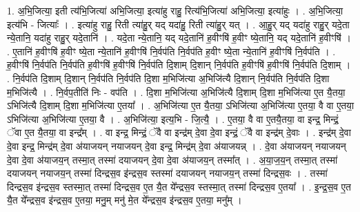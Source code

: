 \documentclass[17pt]{extarticle}
\begin{document}
1. अ॒भि॒जित्या॒ इती त्य॑भि॒जित्या॑ अभि॒जित्या॒ इत्या॑हु राहु॒ रित्य॑भि॒जित्या॑ अभि॒जित्या॒ इत्या॑हुः । . अ॒भि॒जित्या॒ इत्य॑भि - जित्याः᳚ । . इत्या॑हु राहु॒ रिती त्या॑हु॒र् यद् यदा॑हु॒ रिती त्या॑हु॒र् यत् । . आ॒हु॒र् यद् यदा॑हु राहु॒र् यदे॒ता न्ये॒तानि॒ यदा॑हु राहु॒र् यदे॒तानि॑ । . यदे॒ता न्ये॒तानि॒ यद् यदे॒तानि॑ ह॒वीꣳषि॑ ह॒वीꣳ ष्ये॒तानि॒ यद् यदे॒तानि॑ ह॒वीꣳषि॑ । . ए॒तानि॑ ह॒वीꣳषि॑ ह॒वीꣳ ष्ये॒ता न्ये॒तानि॑ ह॒वीꣳषि॑ नि॒र्वप॑ति नि॒र्वप॑ति ह॒वीꣳ ष्ये॒ता न्ये॒तानि॑ ह॒वीꣳषि॑ नि॒र्वप॑ति । . ह॒वीꣳषि॑ नि॒र्वप॑ति नि॒र्वप॑ति ह॒वीꣳषि॑ ह॒वीꣳषि॑ नि॒र्वप॑ति दि॒शाम् दि॒शान् नि॒र्वप॑ति ह॒वीꣳषि॑ ह॒वीꣳषि॑ नि॒र्वप॑ति दि॒शाम् । . नि॒र्वप॑ति दि॒शाम् दि॒शान् नि॒र्वप॑ति नि॒र्वप॑ति दि॒शा म॒भिजि॑त्या अ॒भिजि॑त्यै दि॒शान् नि॒र्वप॑ति नि॒र्वप॑ति दि॒शा म॒भिजि॑त्यै । . नि॒र्वप॒तीति॑ निः - वप॑ति । . दि॒शा म॒भिजि॑त्या अ॒भिजि॑त्यै दि॒शाम् दि॒शा म॒भिजि॑त्या ए॒त यै॒तया॒ ऽभिजि॑त्यै दि॒शाम् दि॒शा म॒भिजि॑त्या ए॒तया᳚ । . अ॒भिजि॑त्या ए॒त यै॒तया॒ ऽभिजि॑त्या अ॒भिजि॑त्या ए॒तया॒ वै वा ए॒तया॒ ऽभिजि॑त्या अ॒भिजि॑त्या ए॒तया॒ वै । . अ॒भिजि॑त्या॒ इत्य॒भि - जि॒त्यै॒ । . ए॒तया॒ वै वा ए॒तयै॒तया॒ वा इन्द्र॒ मिन्द्रं॒ ॅवा ए॒त यै॒तया॒ वा इन्द्र᳚म् । . वा इन्द्र॒ मिन्द्रं॒ ॅवै वा इन्द्र॑म् दे॒वा दे॒वा इन्द्रं॒ ॅवै वा इन्द्र॑म् दे॒वाः । . इन्द्र॑म् दे॒वा दे॒वा इन्द्र॒ मिन्द्र॑म् दे॒वा अ॑याजयन् नयाजयन् दे॒वा इन्द्र॒ मिन्द्र॑म् दे॒वा अ॑याजयन्न् । . दे॒वा अ॑याजयन् नयाजयन् दे॒वा दे॒वा अ॑याजय॒न् तस्मा॒त् तस्मा॑ दयाजयन् दे॒वा दे॒वा अ॑याजय॒न् तस्मा᳚त् । . अ॒या॒ज॒य॒न् तस्मा॒त् तस्मा॑ दयाजयन् नयाजय॒न् तस्मा॑ दिन्द्रस॒व इ॑न्द्रस॒व स्तस्मा॑ दयाजयन् नयाजय॒न् तस्मा॑ दिन्द्रस॒वः । . तस्मा॑ दिन्द्रस॒व इ॑न्द्रस॒व स्तस्मा॒त् तस्मा॑ दिन्द्रस॒व ए॒त यै॒त ये᳚न्द्रस॒व स्तस्मा॒त् तस्मा॑ दिन्द्रस॒व ए॒तया᳚ । . इ॒न्द्र॒स॒व ए॒त यै॒त ये᳚न्द्रस॒व इ॑न्द्रस॒व ए॒तया॒ मनु॒म् मनु॑ मे॒त ये᳚न्द्रस॒व इ॑न्द्रस॒व ए॒तया॒ मनु᳚म् । \newline
\end{document}

